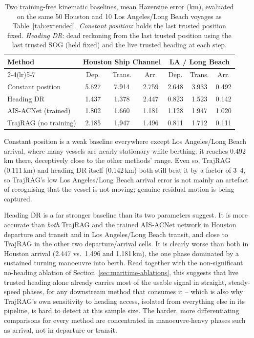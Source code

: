 \begin{table}[t]
\centering
\caption{Two training-free kinematic baselines, mean Haversine error (km),
evaluated on the same 50 Houston and 10 Los Angeles/Long Beach voyages as
Table~\ref{tab:extended}. \emph{Constant position}: holds the last trusted
position fixed. \emph{Heading DR}: dead reckoning from the last trusted
position using the last trusted SOG (held fixed) and the live trusted
heading at each step.}
\label{tab:simple-baselines}
\footnotesize
\setlength{\tabcolsep}{4pt}
\begin{tabular}{lcccccc}
\toprule
\multirow{2}{*}{Method} & \multicolumn{3}{c}{Houston Ship Channel} & \multicolumn{3}{c}{LA / Long Beach} \\
\cmidrule(lr){2-4}\cmidrule(lr){5-7}
 & Dep. & Trans. & Arr. & Dep. & Trans. & Arr. \\
\midrule
Constant position & 5.627 & 7.914 & 2.759 & 2.648 & 3.933 & 0.492 \\
Heading DR & 1.437 & 1.378 & 2.447 & 0.823 & 1.523 & 0.142 \\
AIS-ACNet (trained) & 1.802 & 1.660 & 1.181 & 1.128 & 1.947 & 1.020 \\
TrajRAG (no training) & 2.185 & 1.947 & 1.496 & 0.811 & 1.712 & 0.111 \\
\bottomrule
\end{tabular}
\end{table}

Constant position is a weak baseline everywhere except Los Angeles/Long
Beach arrival, where many vessels are nearly stationary while berthing: it
reaches 0.492\,km there, deceptively close to the other methods'
range. Even so, TrajRAG (0.111\,km) and heading DR itself (0.142\,km) both
still beat it by a factor of 3--4, so TrajRAG's low Los Angeles/Long Beach
arrival error is not mainly an artefact of recognising that the vessel is
not moving; genuine residual motion is being captured.

Heading DR is a far stronger baseline than its two parameters suggest. It
is more accurate than \emph{both} TrajRAG and the trained AIS-ACNet network
in Houston departure and transit and in Los Angeles/Long Beach transit, and
close to TrajRAG in the other two departure/arrival cells. It is clearly
worse than both in Houston arrival (2.447 vs.\ 1.496 and 1.181\,km), the
one phase dominated by a sustained turning manoeuvre into berth. Read
together with the non-significant no-heading ablation of
Section~\ref{sec:maritime-ablations}, this suggests that live trusted
heading alone already carries most of the usable signal in straight,
steady-speed phases, for any downstream method that consumes it -- which is
also why TrajRAG's own sensitivity to heading access, isolated from
everything else in its pipeline, is hard to detect at this sample size. The
harder, more differentiating comparisons for every method are concentrated
in manoeuvre-heavy phases such as arrival, not in departure or transit.

